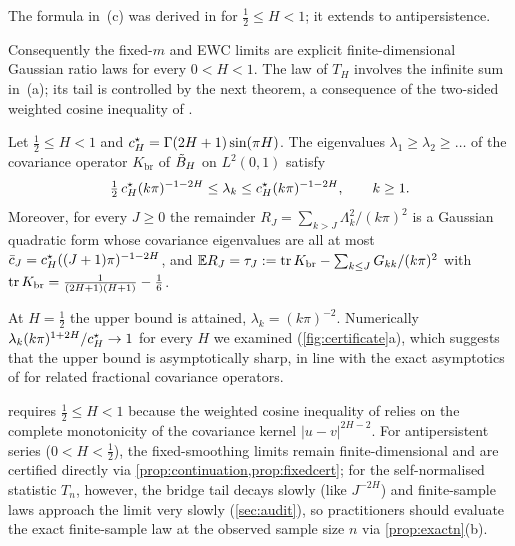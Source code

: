 The formula in~(c) was derived in \citet{AhmedCosChaos} for $\frac12\le H<1$; it extends to antipersistence.


Consequently the fixed-$m$ and EWC limits are explicit finite-dimensional Gaussian ratio laws for every $0<H<1$. The
law of $T_H$ involves the infinite sum in~(a); its tail is controlled by the next theorem, a consequence of the two-sided
weighted cosine inequality of \citet[Lemma~3, two-sided weighted cosine inequality]{AhmedCosChaos}.

\begin{theorem}\label{thm:eig}
Let $\frac12\le H<1$ and $c^{\star}_H=\Gamma(2H+1)\sin(\pi H)$. The eigenvalues $\lambda_1\ge\lambda_2\ge\dots$ of the covariance
operator $K_{\mathrm{br}}$ of $\tilde B_H$ on $L^2(0,1)$ satisfy
\[\tfrac12\,c^{\star}_H(k\pi)^{-1-2H}\le\lambda_k\le c^{\star}_H(k\pi)^{-1-2H},\qquad k\ge1.\]
Moreover, for every $J\ge0$ the remainder $R_J=\sum_{k>J}\Lambda_k^2/(k\pi)^2$ is a Gaussian quadratic form whose
covariance eigenvalues are all at most $\bar c_J=c^{\star}_H((J+1)\pi)^{-1-2H}$, and
$\mathbb E R_J=\tau_J:=\operatorname{tr} K_{\mathrm{br}}-\sum_{k\le J}G_{kk}/(k\pi)^2$ with $\operatorname{tr} K_{\mathrm{br}}=\frac1{(2H+1)(H+1)}-\frac16$.
\end{theorem}

At $H=\frac12$ the upper bound is attained, $\lambda_k=(k\pi)^{-2}$. Numerically $\lambda_k(k\pi)^{1+2H}/c^{\star}_H\to1$ for
every $H$ we examined (\cref{fig:certificate}a), which suggests that the upper bound is asymptotically sharp, in line
with the exact asymptotics of \citet{CK18} for related fractional covariance operators.

\begin{remark}\label{rem:antipersistent}
 requires $\frac12\le H<1$ because the weighted cosine inequality of \citet[Lemma~3]{AhmedCosChaos}
relies on the complete monotonicity of the covariance kernel $|u-v|^{2H-2}$. For antipersistent series
($0<H<\frac12$), the fixed-smoothing limits remain finite-dimensional and are certified directly via
\cref{prop:continuation,prop:fixedcert}; for the self-normalised statistic $T_n$, however, the bridge tail decays
slowly (like $J^{-2H}$) and finite-sample laws approach the limit very slowly (\cref{sec:audit}), so practitioners
should evaluate the exact finite-sample law at the observed sample size $n$ via \cref{prop:exactn}(b).
\end{remark}

